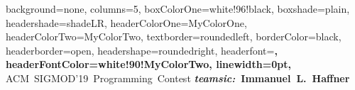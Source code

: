 \documentclass[a1paper,portrait,american,fontscale=.4]{baposter}
\begin{document}
\begin{poster}{
        background=none,
        columns=5,
        boxColorOne=white!96!black,
        boxshade=plain,
        headershade=shadeLR,
        headerColorOne=MyColorOne,
        headerColorTwo=MyColorTwo,
        textborder=roundedleft,
        borderColor=black,
        headerborder=open,
        headershape=roundedright,
        headerfont=\large\bfseries,
        headerFontColor=white!90!MyColorTwo,
        linewidth=0pt,
    }
    {}
    {
        ACM~SIGMOD'19~Programming~Contest
    }
    {
        \vspace*{.5em}
        \bfseries
        \emph{teamsic:}~Immanuel~L.~Haffner
    }
    {
    }

\end{poster}
\end{document}
